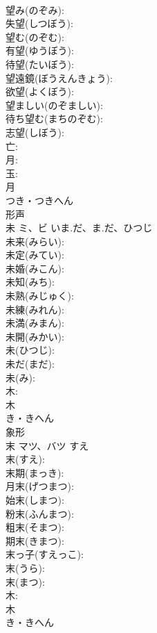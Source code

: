 \documentclass[8pt]{extreport}
\begin{document}
\begin{CJK}{UTF8}{min}
\\	望み(のぞみ): 
\\	失望(しつぼう): 
\\	望む(のぞむ): 
\\	有望(ゆうぼう): 
\\	待望(たいぼう): 
\\	望遠鏡(ぼうえんきょう): 
\\	欲望(よくぼう): 
\\	望ましい(のぞましい): 
\\	待ち望む(まちのぞむ): 
\\	志望(しぼう): 
\\	亡: 
\\	月: 
\\	玉: 
\\	月	
\\	つき・つきへん	
\\	形声 
\\	未	ミ、ビ	いま.だ、ま.だ、ひつじ		
\\	未来(みらい): 
\\	未定(みてい): 
\\	未婚(みこん): 
\\	未知(みち): 
\\	未熟(みじゅく): 
\\	未練(みれん): 
\\	未満(みまん): 
\\	未開(みかい): 
\\	未(ひつじ): 
\\	未だ(まだ): 
\\	未(み): 
\\	木: 
\\	木	
\\	き・きへん	
\\	象形 
\\	末	マツ、バツ	すえ		
\\	末(すえ): 
\\	末期(まっき): 
\\	月末(げつまつ): 
\\	始末(しまつ): 
\\	粉末(ふんまつ): 
\\	粗末(そまつ): 
\\	期末(きまつ): 
\\	末っ子(すえっこ): 
\\	末(うら): 
\\	末(まつ): 
\\	木: 
\\	木	
\\	き・きへん	

\end{CJK}
\end{document}
